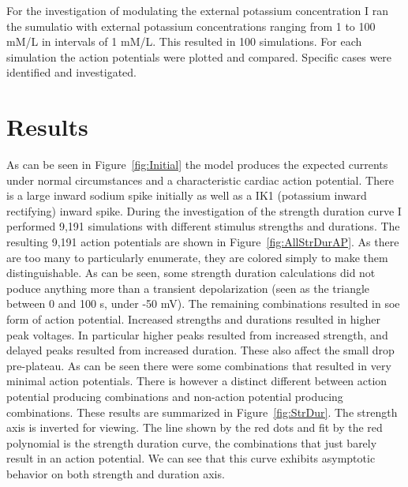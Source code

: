 \documentclass[12pt]{article}
\begin{document}
\par{}
For the investigation of modulating the external potassium concentration I ran the sumulatio with external potassium concentrations ranging from 1 to 100 mM/L in intervals of 1 mM/L. This resulted in 100 simulations. For each simulation the action potentials were plotted and compared. Specific cases were identified and investigated.
\section{Results}

\par{}
As can be seen in Figure~\ref{fig:Initial} the model produces the expected currents under normal circumstances and a characteristic cardiac action potential. There is a large inward sodium spike initially as well as a IK1 (potassium inward rectifying) inward spike. During the investigation of the strength duration curve I performed 9,191 simulations with different stimulus strengths and durations. The resulting 9,191 action potentials are shown in Figure~\ref{fig:AllStrDurAP}. As there are too many to particularly enumerate, they are colored simply to make them distinguishable. As can be seen, some strength duration calculations did not poduce anything more than a transient depolarization (seen as the triangle between 0 and 100 s, under -50 mV). The remaining combinations resulted in soe form of action potential. Increased strengths and durations resulted in higher peak voltages. In particular higher peaks resulted from increased strength, and delayed peaks resulted from increased duration. These also affect the small drop pre-plateau. As can be seen there were some combinations that resulted in very minimal action potentials. There is however a distinct different between action potential producing combinations and non-action potential producing combinations. These results are summarized in Figure~\ref{fig:StrDur}. The strength axis is inverted for viewing. The line shown by the red dots and fit by the red polynomial is the strength duration curve, the combinations that just barely result in an action potential. We can see that this curve exhibits asymptotic behavior on both strength and duration axis.
\end{document}
